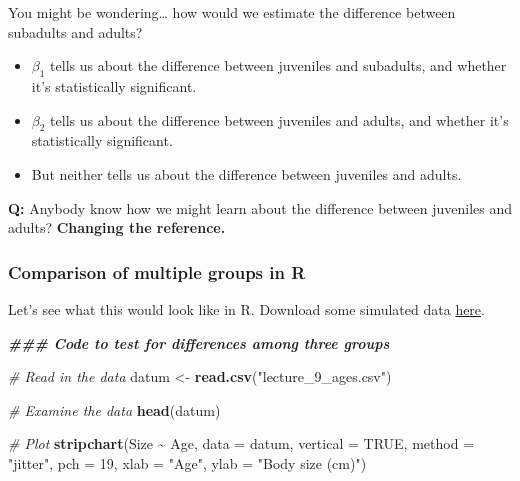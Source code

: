 \documentclass[
]{article}
\newenvironment{Shaded}{\begin{snugshade}}{\end{snugshade}}
\newcommand{\AttributeTok}[1]{\textcolor[rgb]{0.13,0.29,0.53}{#1}}
\newcommand{\CommentTok}[1]{\textcolor[rgb]{0.56,0.35,0.01}{\textit{#1}}}
\newcommand{\ConstantTok}[1]{\textcolor[rgb]{0.56,0.35,0.01}{#1}}
\newcommand{\DecValTok}[1]{\textcolor[rgb]{0.00,0.00,0.81}{#1}}
\newcommand{\DocumentationTok}[1]{\textcolor[rgb]{0.56,0.35,0.01}{\textbf{\textit{#1}}}}
\newcommand{\FunctionTok}[1]{\textcolor[rgb]{0.13,0.29,0.53}{\textbf{#1}}}
\newcommand{\NormalTok}[1]{#1}
\newcommand{\OtherTok}[1]{\textcolor[rgb]{0.56,0.35,0.01}{#1}}
\newcommand{\SpecialCharTok}[1]{\textcolor[rgb]{0.81,0.36,0.00}{\textbf{#1}}}
\newcommand{\StringTok}[1]{\textcolor[rgb]{0.31,0.60,0.02}{#1}}
\providecommand{\tightlist}{%
  \setlength{\itemsep}{0pt}\setlength{\parskip}{0pt}}
\begin{document}
You might be wondering\ldots{} how would we estimate the difference
between subadults and adults?

\begin{itemize}
\tightlist
\item
  \(\beta_1\) tells us about the difference between juveniles and
  subadults, and whether it's statistically significant.
\item
  \(\beta_2\) tells us about the difference between juveniles and
  adults, and whether it's statistically significant.
\item
  But neither tells us about the difference between juveniles and
  adults.
\end{itemize}

\textbf{Q:} Anybody know how we might learn about the difference between
juveniles and adults? \textbf{Changing the reference.}

\subsubsection{Comparison of multiple groups in
R}\label{comparison-of-multiple-groups-in-r}

Let's see what this would look like in R. Download some simulated data
\href{lecture_9_ages.csv}{here}.

\begin{Shaded}
\begin{Highlighting}[]
\DocumentationTok{\#\#\# Code to test for differences among three groups}

\CommentTok{\# Read in the data}
\NormalTok{datum }\OtherTok{\textless{}{-}} \FunctionTok{read.csv}\NormalTok{(}\StringTok{"lecture\_9\_ages.csv"}\NormalTok{)}

\CommentTok{\# Examine the data}
\FunctionTok{head}\NormalTok{(datum)}

\CommentTok{\# Plot}
\FunctionTok{stripchart}\NormalTok{(Size }\SpecialCharTok{\textasciitilde{}}\NormalTok{ Age, }\AttributeTok{data =}\NormalTok{ datum, }\AttributeTok{vertical =} \ConstantTok{TRUE}\NormalTok{, }\AttributeTok{method =} \StringTok{"jitter"}\NormalTok{,}
           \AttributeTok{pch =} \DecValTok{19}\NormalTok{, }\AttributeTok{xlab =} \StringTok{"Age"}\NormalTok{, }\AttributeTok{ylab =} \StringTok{"Body size (cm)"}\NormalTok{)}
\end{Highlighting}
\end{Shaded}
\end{document}
